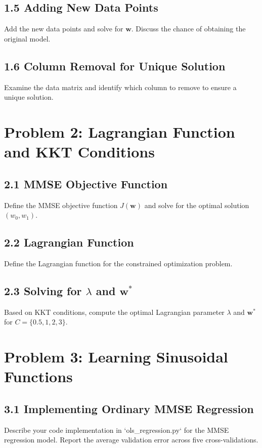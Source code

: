 \documentclass[12pt]{article}
\begin{document}
\subsection*{1.5 Adding New Data Points}
Add the new data points and solve for \( \mathbf{w} \). Discuss the chance of obtaining the original model.

\subsection*{1.6 Column Removal for Unique Solution}
Examine the data matrix and identify which column to remove to ensure a unique solution.

\section*{Problem 2: Lagrangian Function and KKT Conditions}

\subsection*{2.1 MMSE Objective Function}
Define the MMSE objective function \( J(\mathbf{w}) \) and solve for the optimal solution \( (w_0, w_1) \).

\subsection*{2.2 Lagrangian Function}
Define the Lagrangian function for the constrained optimization problem.

\subsection*{2.3 Solving for \( \lambda \) and \( \mathbf{w}^* \)}
Based on KKT conditions, compute the optimal Lagrangian parameter \( \lambda \) and \( \mathbf{w}^* \) for \( C = \{0.5, 1, 2, 3\} \).

\section*{Problem 3: Learning Sinusoidal Functions}

\subsection*{3.1 Implementing Ordinary MMSE Regression}
Describe your code implementation in `ols\_regression.py` for the MMSE regression model. Report the average validation error across five cross-validations.
\end{document}
